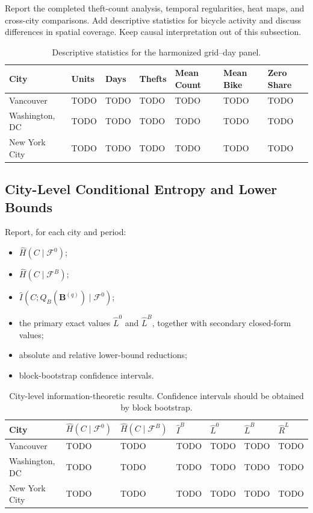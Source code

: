 \documentclass[applsci,article,submit,moreauthors]{Definitions/mdpi}
\begin{document}
Report the completed theft-count analysis, temporal regularities, heat maps, and cross-city comparisons. Add descriptive statistics for bicycle activity and discuss differences in spatial coverage. Keep causal interpretation out of this subsection.

\begin{table}[H]
\caption{Descriptive statistics for the harmonized grid--day panel.}
\label{tab:descriptive_statistics}
\begin{tabularx}{\textwidth}{lXXXXXX}
\toprule
\textbf{City} & \textbf{Units} & \textbf{Days} & \textbf{Thefts} & \textbf{Mean Count} & \textbf{Mean Bike} & \textbf{Zero Share}\\
\midrule
Vancouver & TODO & TODO & TODO & TODO & TODO & TODO\\
Washington, DC & TODO & TODO & TODO & TODO & TODO & TODO\\
New York City & TODO & TODO & TODO & TODO & TODO & TODO\\
\bottomrule
\end{tabularx}
\end{table}

\subsection{City-Level Conditional Entropy and Lower Bounds}
\label{subsec:results_city_entropy}

Report, for each city and period:
\begin{itemize}
    \item \(\widehat{H}(C\mid\mathcal{F}^{0})\);
    \item \(\widehat{H}(C\mid\mathcal{F}^{B})\);
    \item \(\widehat{I}(C;Q_B(\mathbf{B}^{(q)})\mid\mathcal{F}^{0})\);
    \item the primary exact values \(\widehat{L}^{0}\) and \(\widehat{L}^{B}\), together with secondary closed-form values;
    \item absolute and relative lower-bound reductions;
    \item block-bootstrap confidence intervals.
\end{itemize}

\begin{table}[H]
\caption{City-level information-theoretic results. Confidence intervals should be obtained by block bootstrap.}
\label{tab:city_entropy_results}
\begin{tabularx}{\textwidth}{lXXXXXX}
\toprule
\textbf{City} & \(\widehat{H}(C\mid\mathcal{F}^{0})\) & \(\widehat{H}(C\mid\mathcal{F}^{B})\) & \(\widehat{I}^{B}\) & \(\widehat{L}^{0}\) & \(\widehat{L}^{B}\) & \(\widehat{R}^{L}\)\\
\midrule
Vancouver & TODO & TODO & TODO & TODO & TODO & TODO\\
Washington, DC & TODO & TODO & TODO & TODO & TODO & TODO\\
New York City & TODO & TODO & TODO & TODO & TODO & TODO\\
\bottomrule
\end{tabularx}
\end{table}
\end{document}
